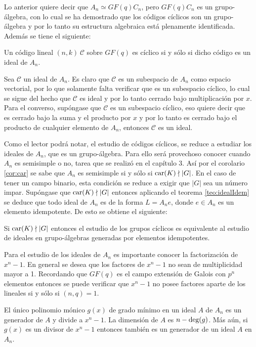 Lo anterior quiere decir que $A_n \simeq GF(q)C_n$, pero $GF(q)C_n$ es un grupo-álgebra, con lo cual se ha demostrado que los códigos cíclicos son un grupo-álgebra y por lo tanto su estructura algebraica está plenamente identificada. Además se tiene el siguiente:
\begin{teorema}
Un código lineal $(n,k) \ \mathcal{C}$ sobre $GF(q)$ es cíclico si y sólo si dicho código es un ideal de $A_n$.
\end{teorema}
\begin{proof*}
Sea $\mathcal{C}$ un ideal de $A_n$. Es claro que $\mathcal{C}$ es un subespacio de $A_n$ como espacio vectorial, por lo que solamente falta verificar que es un subespacio cíclico, lo cual se sigue del hecho que $\mathcal{C}$ es ideal y por lo tanto cerrado bajo multiplicación por $x$.
Para el converso, supóngase que $\mathcal{C}$ es un subespacio cíclico, eso quiere decir que es cerrado bajo la suma y el producto por $x$ y por lo tanto es cerrado bajo el producto de cualquier elemento de $A_n$, entonces $\mathcal{C}$ es un ideal.
\end{proof*}
Como el lector podrá notar, el estudio de códigos cíclicos, se reduce a estudiar los ideales de $A_n$, que es un grupo-álgebra. Para ello será provechoso conocer cuando $A_n$ es semisimple o no, tarea que se realizó en el capítulo 3. 
Así por el corolario \ref{cor:car} se sabe que $A_n$ es semisimple si y sólo si $\operatorname{car}(K) \nmid |G|$. En el caso de tener un campo binario, esta condición se reduce a exigir que $|G|$ sea un número impar. Supóngase que $\operatorname{car}(K) \nmid |G|$ entonces aplicando el teorema \ref{teo:idealIdem} se deduce que todo ideal de $A_n$ es de la forma $L=A_ne$, donde $e \in A_n$ es un elemento idempotente. De esto se obtiene el siguiente:
\begin{teorema}
Si $\operatorname{car}(K)\nmid|G|$ entonces el estudio de los grupos cíclicos es equivalente al estudio de ideales en grupo-álgebras generadas por elementos idempotentes.
\end{teorema}
Para el estudio de los ideales de $A_n$ es importante conocer la factorización de $x^n-1$. En general se desea que los factores de $x^n-1$ no sean de multiplicidad mayor a 1. Recordando que $GF(q)$ es el campo extensión de Galois con $p^n$ elementos entonces se puede verificar que $x^n-1$ no posee factores aparte de los lineales si y sólo si $(n,q)=1$.
\begin{teorema}
El único polinomio mónico $g(x)$ de grado mínimo en un ideal $A$ de $A_n$ es un generador de $A$ y divide a $x^n-1$. La dimensión de $A$ es $n -\operatorname{deg}(g)$. Más aún, si $g(x)$ es un divisor de $x^n-1$ entonces también es un generador de un ideal $A$ en $A_n$.
\end{teorema}
